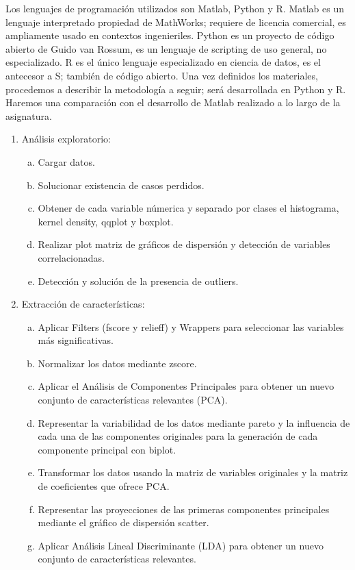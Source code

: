\documentclass{article}
\begin{document}
Los lenguajes de programación utilizados son Matlab, Python y R. Matlab es un
lenguaje interpretado propiedad de MathWorks; requiere de licencia comercial,
es ampliamente usado en contextos ingenieriles. Python es un proyecto de código
abierto de Guido van Rossum, es un lenguaje de scripting de uso general, no
especializado. R es el único lenguaje especializado en ciencia de datos, es el
antecesor a S; también de código abierto. Una vez definidos los materiales,
procedemos a describir la metodología a seguir; será desarrollada en Python y
R. Haremos una comparación con el desarrollo de Matlab realizado a lo largo de
la asignatura.

\begin{enumerate}
\item
Análisis exploratorio:
\begin{enumerate}[a)]
\item
Cargar datos.
\item
Solucionar existencia de casos perdidos.
\item
Obtener de cada variable númerica y separado por clases el histograma, kernel density, qqplot y boxplot.
\item
Realizar plot matriz de gráficos de dispersión y detección de variables correlacionadas.
\item
Detección y solución de la presencia de outliers.
\end{enumerate}
\item
Extracción de características:
\begin{enumerate}[a)]
\item
Aplicar Filters (fscore y relieff) y Wrappers para seleccionar las variables más significativas.
\item
Normalizar los datos mediante zscore.
\item
Aplicar el Análisis de Componentes Principales para obtener un nuevo conjunto de características relevantes (PCA).
\item
Representar la variabilidad de los datos mediante pareto y la influencia de cada una de las componentes originales para la generación de cada componente principal con biplot.
\item
Transformar los datos usando la matriz de variables originales y la matriz de coeficientes que ofrece PCA.
\item
Representar las proyecciones de las primeras componentes principales mediante el gráfico de dispersión scatter.
\item
Aplicar Análisis Lineal Discriminante (LDA) para obtener un nuevo conjunto de características relevantes.

\end{enumerate}
\end{enumerate}
\end{document}
